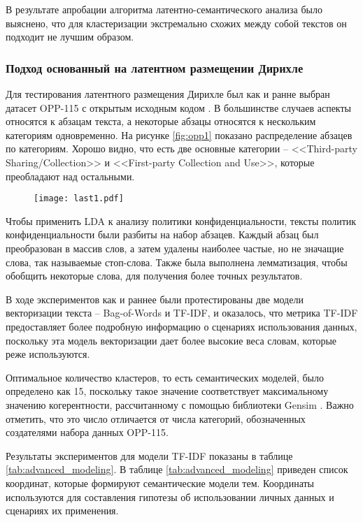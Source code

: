 \documentclass[../main]{subfiles}
\begin{document}
В результате апробации алгоритма латентно-семантического анализа было выяснено, что для кластеризации экстремально схожих между собой текстов он подходит не лучшим образом.

\subsubsection{Подход основанный на латентном размещении Дирихле}

Для тестирования латентного размещения Дирихле был как и ранне выбран датасет OPP-115 с открытым исходным кодом \cite{MDPI18}. В большинстве случаев аспекты относятся к абзацам текста, а некоторые абзацы относятся к нескольким категориям одновременно. На рисунке \ref{fig:opp1} показано распределение абзацев по категориям. Хорошо видно, что есть две основные категории – <<Third-party Sharing/Collection>> и <<First-party Collection and Use>>, которые преобладают над остальными.

\begin{figure}[H]
    \centering
    {\texttt{[image: last1.pdf]}}
    \vspace{-\baselineskip}
\end{figure}

Чтобы применить LDA к анализу политики конфиденциальности, тексты политик конфиденциальности были разбиты на набор абзацев. Каждый абзац был преобразован в массив слов, а затем удалены наиболее частые, но не значащие слова, так называемые стоп-слова. Также была выполнена лемматизация, чтобы обобщить некоторые слова, для получения более точных результатов.

В ходе экспериментов как и раннее были протестированы две модели векторизации текста – Bag-of-Words и TF-IDF, и оказалось, что метрика TF-IDF предоставляет более подробную информацию о сценариях использования данных, поскольку эта модель векторизации дает более высокие веса словам, которые реже используются.

Оптимальное количество кластеров, то есть семантических моделей, было определено как 15, поскольку такое значение соответствует максимальному значению когерентности, рассчитанному с помощью библиотеки Gensim \cite{MDPI13}. Важно отметить, что это число отличается от числа категорий, обозначенных создателями набора данных OPP-115.

Результаты экспериментов для модели TF-IDF показаны в таблице \ref{tab:advanced_modeling}. В таблице \ref{tab:advanced_modeling} приведен список координат, которые формируют семантические модели тем. Координаты используются для составления гипотезы об использовании личных данных и сценариях их применения.
\end{document}
